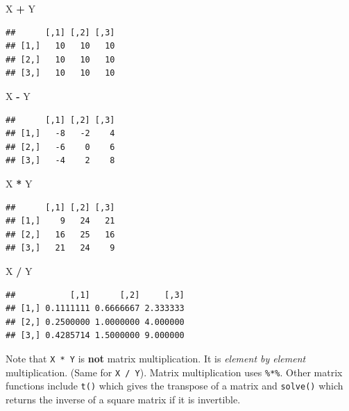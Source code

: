 \documentclass[]{book}
\newenvironment{Shaded}{\begin{snugshade}}{\end{snugshade}}
\newcommand{\StringTok}[1]{\textcolor[rgb]{0.31,0.60,0.02}{#1}}
\newcommand{\OperatorTok}[1]{\textcolor[rgb]{0.81,0.36,0.00}{\textbf{#1}}}
\newcommand{\NormalTok}[1]{#1}
\begin{document}
\begin{Shaded}
\begin{Highlighting}[]
\NormalTok{X }\OperatorTok{+}\StringTok{ }\NormalTok{Y}
\end{Highlighting}
\end{Shaded}

\begin{verbatim}
##      [,1] [,2] [,3]
## [1,]   10   10   10
## [2,]   10   10   10
## [3,]   10   10   10
\end{verbatim}

\begin{Shaded}
\begin{Highlighting}[]
\NormalTok{X }\OperatorTok{-}\StringTok{ }\NormalTok{Y}
\end{Highlighting}
\end{Shaded}

\begin{verbatim}
##      [,1] [,2] [,3]
## [1,]   -8   -2    4
## [2,]   -6    0    6
## [3,]   -4    2    8
\end{verbatim}

\begin{Shaded}
\begin{Highlighting}[]
\NormalTok{X }\OperatorTok{*}\StringTok{ }\NormalTok{Y}
\end{Highlighting}
\end{Shaded}

\begin{verbatim}
##      [,1] [,2] [,3]
## [1,]    9   24   21
## [2,]   16   25   16
## [3,]   21   24    9
\end{verbatim}

\begin{Shaded}
\begin{Highlighting}[]
\NormalTok{X }\OperatorTok{/}\StringTok{ }\NormalTok{Y}
\end{Highlighting}
\end{Shaded}

\begin{verbatim}
##           [,1]      [,2]     [,3]
## [1,] 0.1111111 0.6666667 2.333333
## [2,] 0.2500000 1.0000000 4.000000
## [3,] 0.4285714 1.5000000 9.000000
\end{verbatim}

Note that \texttt{X\ *\ Y} is \textbf{not} matrix multiplication. It is
\emph{element by element} multiplication. (Same for \texttt{X\ /\ Y}).
Matrix multiplication uses \texttt{\%*\%}. Other matrix functions
include \texttt{t()} which gives the transpose of a matrix and
\texttt{solve()} which returns the inverse of a square matrix if it is
invertible.
\end{document}
